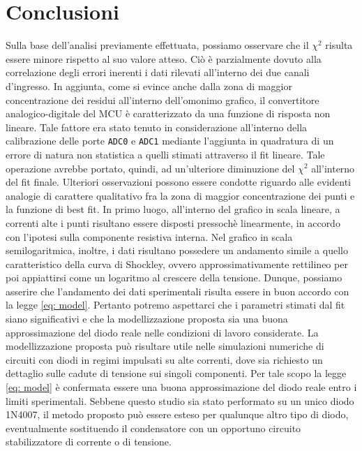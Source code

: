 \documentclass{article}[a4paper, oneside, 11pt]
\begin{document}
\section{Conclusioni}
Sulla base dell'analisi previamente effettuata, possiamo osservare che il
$\chi^2$ risulta essere minore rispetto al suo valore atteso. Ciò \`e
parzialmente dovuto alla correlazione degli errori inerenti i dati rilevati
all'interno dei due canali d'ingresso. In aggiunta, come si evince anche dalla
zona di maggior concentrazione dei residui all'interno dell'omonimo grafico,
il convertitore analogico-digitale del MCU \`e caratterizzato da una funzione
di risposta non lineare. Tale fattore era stato tenuto in considerazione
all'interno della calibrazione delle porte \verb+ADC0+ e \verb+ADC1+ mediante
l'aggiunta in quadratura di un errore di natura non statistica a quelli stimati
attraverso il fit lineare. Tale operazione avrebbe portato, quindi, ad
un'ulteriore diminuzione del $\chi^2$ all'interno del fit finale.
Ulteriori osservazioni possono essere condotte riguardo alle evidenti analogie
di carattere qualitativo fra la zona di maggior concentrazione dei punti e la
funzione di best fit.
In primo luogo, all'interno del grafico in scala lineare, a correnti alte
i punti risultano essere disposti pressoch\`e linearmente, in accordo con
l'ipotesi sulla componente resistiva interna. Nel grafico in scala
semilogaritmica, inoltre, i dati risultano possedere un andamento simile a
quello caratteristico della curva di Shockley, ovvero approssimativamente
rettilineo per poi appiattirsi come un logaritmo al crescere della tensione.
Dunque, possiamo asserire che l'andamento dei dati sperimentali risulta essere
in buon accordo con la legge \eqref{eq: model}.
Pertanto potremo aspettarci che i parametri stimati dal fit siano significativi 
e che la modellizzazione proposta sia una buona approssimazione del diodo reale 
nelle condizioni di lavoro considerate. La modellizzazione proposta può
risultare utile nelle simulazioni numeriche di circuiti con diodi in regimi
impulsati su alte correnti, dove sia richiesto un dettaglio sulle cadute di
tensione sui singoli componenti. Per tale scopo la legge \eqref{eq: model} \`e
confermata essere una buona approssimazione del diodo reale entro i limiti
sperimentali. Sebbene questo studio sia stato performato su un unico diodo
1N4007, il metodo proposto pu\`o essere esteso per qualunque altro tipo di
diodo, eventualmente sostituendo il condensatore con un opportuno circuito
stabilizzatore di corrente o di tensione.

\end{document}
